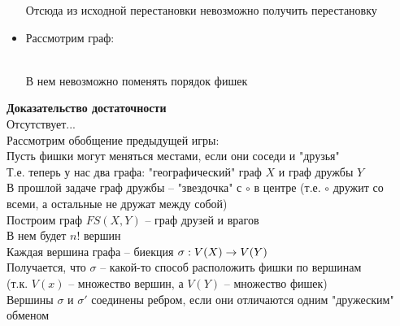 \documentclass[12pt]{article}
\begin{document}
\begin{itemize}
    Отсюда из исходной перестановки невозможно получить перестановку\\
    \item Рассмотрим граф:\\
    \\
    В нем невозможно поменять порядок фишек\\
\end{itemize}
\textbf{Доказательство достаточности}\\
Отсутствует...\\
Рассмотрим обобщение предыдущей игры:\\
Пусть фишки могут меняться местами, если они соседи и "друзья"\\
Т.е. теперь у нас два графа: "географический" граф $X$ и граф дружбы $Y$\\
В прошлой задаче граф дружбы -- "звездочка" с $\circ$ в центре (т.е. $\circ$ дружит со всеми, а остальные не дружат между собой)\\
Построим граф $FS(X, Y)$ -- граф друзей и врагов\\
В нем будет $n!$ вершин\\
Каждая вершина графа -- биекция $\sigma: V(X) \rightarrow V(Y)$\\
Получается, что $\sigma$ -- какой-то способ расположить фишки по вершинам\\
(т.к. $V(x)$ -- множество вершин, а $V(Y)$ -- множество фишек)\\
Вершины $\sigma$ и $\sigma'$ соединены ребром, если они отличаются одним "дружеским" обменом\\
\end{document}
